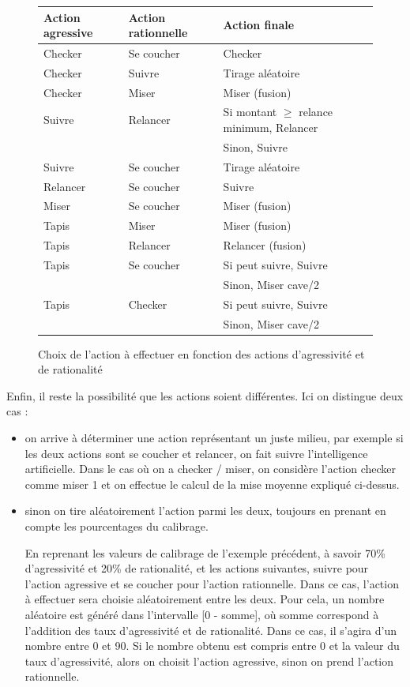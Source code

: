 \documentclass{report}
\begin{document}
\begin{figure}[H]
\begin{center}
\begin{tabular}{|l|l|l|}
	\hline
	Action agressive		&	Action rationnelle 	&	Action finale\\
	\hline
	Checker		&	Se coucher	&	Checker\\
	\hline
	Checker		&	Suivre		&	Tirage aléatoire\\
	\hline
	Checker		&	Miser		&	Miser (fusion)\\
	\hline
	Suivre		&	Relancer		&	Si montant $\geq$ relance minimum, Relancer\\
				&				&		Sinon, Suivre\\
	\hline
	Suivre		&	Se coucher	&	Tirage aléatoire\\
	\hline
	Relancer		&	Se coucher	&	Suivre\\
	\hline
	Miser		&	Se coucher	&	Miser (fusion)\\
	\hline
	Tapis		&	Miser		&	Miser (fusion)\\
	\hline
	Tapis		&	Relancer		&	Relancer (fusion)\\
	\hline
	Tapis		&	Se coucher	&	Si peut suivre, Suivre\\
				&				&	Sinon, Miser cave/2\\
	\hline
	Tapis		&	Checker		&	Si peut suivre, Suivre\\
				&				&   Sinon, Miser cave/2\\
	\hline
\end{tabular}
\end{center}
\caption{Choix de l'action à effectuer en fonction des actions d'agressivité et de rationalité}
\end{figure}

Enfin, il reste la possibilité que les actions soient différentes. Ici on distingue deux cas :
\begin{itemize}
\renewcommand{\labelitemi}{-}
\item on arrive à déterminer une action représentant un juste milieu, par exemple si les deux actions sont se coucher et relancer, on fait suivre l'intelligence artificielle. Dans le cas où on a checker / miser, on considère l'action checker comme miser 1 et on effectue le calcul de la mise moyenne expliqué ci-dessus.
\item sinon on tire aléatoirement l'action parmi les deux, toujours en prenant en compte les pourcentages du calibrage. 

En reprenant les valeurs de calibrage de l'exemple précédent, à savoir 70\% d'agressivité et 20\% de rationalité, et les actions suivantes, suivre pour l'action agressive et se coucher pour l'action rationnelle. Dans ce cas, l'action à effectuer sera choisie aléatoirement entre les deux. Pour cela, un nombre aléatoire est généré dans l'intervalle [0 - somme], où somme correspond à l'addition des taux d'agressivité et de rationalité. Dans ce cas, il s'agira d'un nombre entre 0 et 90. Si le nombre obtenu est compris entre 0 et la valeur du taux d'agressivité, alors on choisit l'action agressive, sinon on prend l'action rationnelle.\\


\end{itemize}
\end{document}

